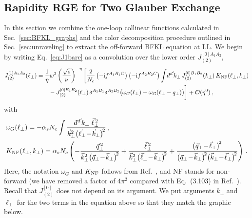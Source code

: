 \documentclass[letterpaper,11pt]{article}
\newcommand{\eq}[1]{Eq.~\eqref{eq:#1}}
\renewcommand{\sec}[1]{Sec.~\ref{sec:#1}}
\newcommand{\img}{\mathrm{i}}
\newcommand{\w}{\omega}
\newcommand{\as}{\alpha_s}
\newcommand{\nn}{\nonumber}
\newcommand\prp[1]{\vec #1_\perp}
\newcommand\prpsq[1]{\vec{#1}^{2}_\perp}
\newcommand\prpsqm[2]{\bigl( \prp{#1} \!-\! \prp{#2} \bigr)^{\!2}}
\newcommand\prnth[1]{\left(#1\right)}
\newcommand{\dbar}{d\hspace*{-0.08em}\bar{}\hspace*{0.1em}}
\begin{document}
\subsection{Rapidity RGE for Two Glauber Exchange}
\label{sec:BFKL_RGE}

In this section we combine the one-loop collinear functions calculated in \sec{BFKL_graphs} and the color decomposition procedure outlined in \sec{unraveling} to extract the off-forward BFKL equation at LL. We begin by writing \eq{J1bare} as a convolution over the lower order $J_{(2)}^{[0]A_1A_2}$,
\begin{align}
J_{(2)}^{[1]A_1A_2}(\ell_\perp) &=  \frac1{\eta} w^2 \left(\frac{\sqrt{s}}{\nu} \right)^{-\eta} \bigg[
  \frac2{N_c}\prnth{-\img f^{A_1B_1C}} \prnth{-\img f^{A_2B_2C}} \int\! \dbar^{d'}\!k_\perp \, J_{(2)}^{[0]B_1 B_2 }(k_\perp)\,  K_\text{NF}(\ell_\perp, k_\perp)
    \nn \\
    & \qquad - J_{(2)}^{[0]B_1B_2}(\ell_\perp)\, \delta^{A_1B_1}\delta^{A_2B_2}  \bigl(\omega_G(\ell_\perp) + \omega_G(\ell_\perp-q_\perp)\bigr) 
   \bigg] + \mathcal{O}(\eta^0)\,,
\end{align}
%   
with
%
\begin{align}
    & \omega_G(\ell_\perp) = -\as N_c \int \frac{\dbar^{d'}\!k_\perp \; \vec\ell_\perp^{\,2}}{\prpsq{k} \prpsqm{\ell}{k}} \,,
    \nn \\
    & K_\text{NF}(\ell_\perp, k_\perp) = 
    \as N_c
    \prnth{-\frac{\vec q_\perp^{\,2}}{\prpsq{k} \prpsqm{q}{k}} + \frac{\vec\ell_\perp^{\,2}}{\prpsq{k}\prpsqm{\ell}{k}} + \frac{\prpsqm{q}{\ell}}{ \prpsqm{q}{k} \prpsqm{k}{\ell}} } \, .
\end{align}
%
Here, the notation $\w_G$ and $K_{\rm NF}$ follows from Ref.~\cite{Kovchegov:2012mbw}, and NF stands for non-forward (we have removed a factor of $4\pi^2$ compared with Eq.~(3.103) in Ref.~\cite{Kovchegov:2012mbw}).
Recall that $J_{(2)}^{[0]}$ does not depend on its argument. We put arguments $k_\perp$ and $\ell_\perp$ for the two terms in the equation above so that they match the graphic below.
\end{document}
